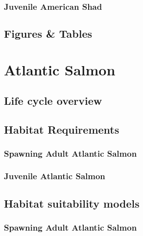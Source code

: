 \documentclass[
]{book}
\begin{document}
\hypertarget{juvenile-american-shad-1}{%
\subsection{Juvenile American Shad}\label{juvenile-american-shad-1}}

\hypertarget{figures-tables-2}{%
\section{Figures \& Tables}\label{figures-tables-2}}

\hypertarget{atlantic-salmon}{%
\chapter{Atlantic Salmon}\label{atlantic-salmon}}

\hypertarget{life-cycle-overview-3}{%
\section{Life cycle overview}\label{life-cycle-overview-3}}

\hypertarget{habitat-requirements-3}{%
\section{Habitat Requirements}\label{habitat-requirements-3}}

\hypertarget{spawning-adult-atlantic-salmon}{%
\subsection{Spawning Adult Atlantic Salmon}\label{spawning-adult-atlantic-salmon}}

\hypertarget{juvenile-atlantic-salmon}{%
\subsection{Juvenile Atlantic Salmon}\label{juvenile-atlantic-salmon}}

\hypertarget{habitat-suitability-models-3}{%
\section{Habitat suitability models}\label{habitat-suitability-models-3}}

\hypertarget{spawning-adult-atlantic-salmon-1}{%
\subsection{Spawning Adult Atlantic Salmon}\label{spawning-adult-atlantic-salmon-1}}
\end{document}
